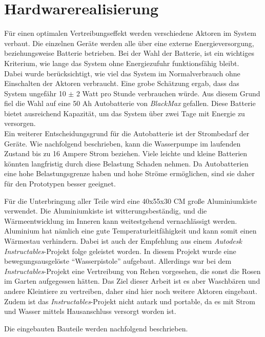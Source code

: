 
\section{Hardwarerealisierung}

Für einen optimalen Vertreibungseffekt werden verschiedene Aktoren im System verbaut. Die einzelnen Geräte werden alle über eine externe Energieversorgung, beziehungsweise Batterie betrieben. Bei der Wahl der Batterie, ist ein wichtiges Kriterium, wie lange das System ohne Energiezufuhr funktionsfähig bleibt.
\\
Dabei wurde berücksichtigt, wie viel das System im Normalverbrauch ohne Einschalten der Aktoren verbraucht. Eine grobe Schätzung ergab, dass das System ungefähr 10 $\pm$ 2 Watt pro Stunde verbrauchen würde. Aus diesem Grund fiel die Wahl auf eine 50 Ah Autobatterie von \textit{BlackMax} \cite{Autobatterie} gefallen. Diese Batterie bietet ausreichend Kapazität, um das System über zwei Tage mit Energie zu versorgen.
\\
Ein weiterer Entscheidungsgrund für die Autobatterie ist der Strombedarf der Geräte. Wie nachfolgend beschrieben, kann die Wasserpumpe im laufenden Zustand bis zu 16 Ampere Strom beziehen. Viele leichte und kleine Batterien könnten langfristig durch diese Belastung Schaden nehmen. Da Autobatterien eine hohe Belastungsgrenze haben und hohe Ströme ermöglichen, sind sie daher für den Prototypen besser geeignet.

Für die Unterbringung aller Teile wird eine 40x55x30 \ac{CM} große Aluminiumkiste verwendet. Die Aluminiumkiste ist witterungsbeständig, und die Wärmeentwicklung im Inneren kann weitestgehend vernachlässigt werden. Aluminium hat nämlich eine gute Temperaturleitfähigkeit und kann somit einen Wärmestau verhindern. Dabei ist auch der Empfehlung aus einem \textit{Autodesk Instructables}-Projekt folge geleistet worden. In diesem Projekt wurde eine bewegungsausgelöste "`Wasserpistole"' aufgebaut. Allerdings war bei dem \textit{Instructables}-Projekt eine Vertreibung von Rehen vorgesehen, die sonst die Rosen im Garten aufgegessen hätten. Das Ziel dieser Arbeit ist es aber Waschbären und andere Kleintiere zu vertreiben, daher sind hier noch weitere Aktoren eingebaut. Zudem ist das \textit{Instructables}-Projekt nicht autark und portable, da es mit Strom und Wasser mittels Hausanschluss versorgt worden ist. \cite{watergun_dude}

Die eingebauten Bauteile werden nachfolgend beschrieben.

